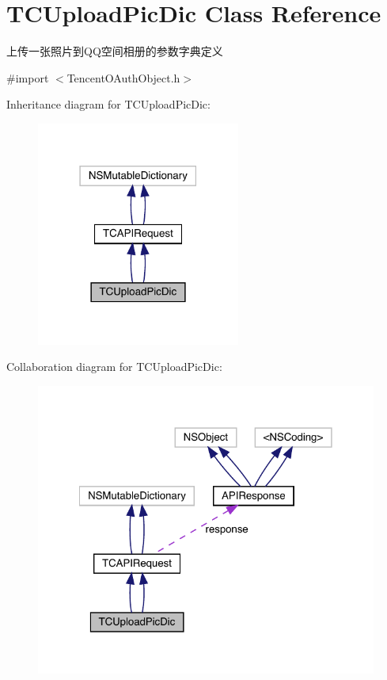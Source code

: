\hypertarget{interface_t_c_upload_pic_dic}{}\section{T\+C\+Upload\+Pic\+Dic Class Reference}
\label{interface_t_c_upload_pic_dic}


上传一张照片到\+Q\+Q空间相册的参数字典定义  




{\ttfamily \#import $<$Tencent\+O\+Auth\+Object.\+h$>$}



Inheritance diagram for T\+C\+Upload\+Pic\+Dic\+:\nopagebreak
\begin{figure}[H]
\begin{center}
\leavevmode
\includegraphics[width=190pt]{interface_t_c_upload_pic_dic__inherit__graph}
\end{center}
\end{figure}


Collaboration diagram for T\+C\+Upload\+Pic\+Dic\+:\nopagebreak
\begin{figure}[H]
\begin{center}
\leavevmode
\includegraphics[width=322pt]{interface_t_c_upload_pic_dic__coll__graph}
\end{center}
\end{figure}

